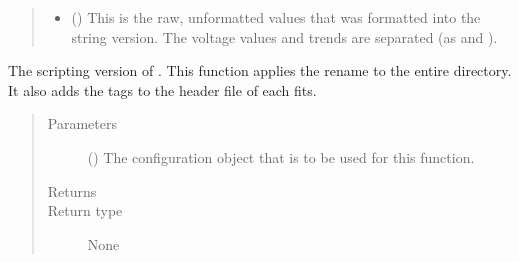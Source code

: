 \documentclass[letterpaper,10pt,english]{sphinxmanual}
\begin{document}
\begin{fulllineitems}
\begin{quote}
\begin{description}
\begin{itemize}
\item {} 
 () \textendash{} This is the raw, unformatted values that was formatted
into the string version. The voltage values and trends are
separated (as  and ).

\end{itemize}


\end{description}\end{quote}

\end{fulllineitems}


\begin{fulllineitems}
\label{\detokenize{docstrings/ifa_smeargle.reformat.renaming:ifa_smeargle.reformat.renaming.script_rename_detector}}
The scripting version of . This function
applies the rename to the entire directory. It also adds the
tags to the header file of each fits.
\begin{quote}\begin{description}
\item[{Parameters}] \leavevmode
{} () \textendash{} The configuration object that is to be used for
this function.

\item[{Returns}] \leavevmode


\item[{Return type}] \leavevmode
None

\end{description}\end{quote}

\end{fulllineitems}

\end{document}
